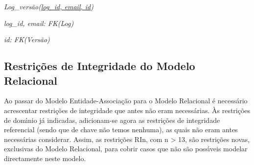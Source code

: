\documentclass[11pt,a4paper]{article}
\begin{document}
\begin{description}[noitemsep]
	\item\textit{ Log\_vers\~{a}o(\underline{log\_id, email, id})}
	\item\textit{ log\_id, email: FK(Log)}
	\item\textit{ id: FK(Vers\~{a}o)}
\end{description}

\newpage

\subsection{Restri\c{c}\~oes de Integridade do Modelo Relacional}

Ao passar do Modelo Entidade-Associa\c{c}\~{a}o para o Modelo Relacional \'{e} necess\'{a}rio
acrescentar restri\c{c}\~{o}es de integridade que antes n\~{a}o eram necess\'{a}rias. \`{A}s
restri\c{c}\~{o}es de dom\'{\i}nio j\'{a} indicadas, adicionam-se agora as restri\c{c}\~{o}es de
integridade referencial (sendo que de chave n\~{a}o temos nenhuma), as quais n\~{a}o
eram antes necess\'{a}rias considerar. Assim, as restri\c{c}\~{o}es RIn, com n \textgreater{} 13, s\~{a}o
restri\c{c}\~{o}es novas, exclusivas do Modelo Relacional, para cobrir casos que n\~{a}o s\~{a}o
poss\'{\i}veis modelar directamente neste modelo.
\end{document}
